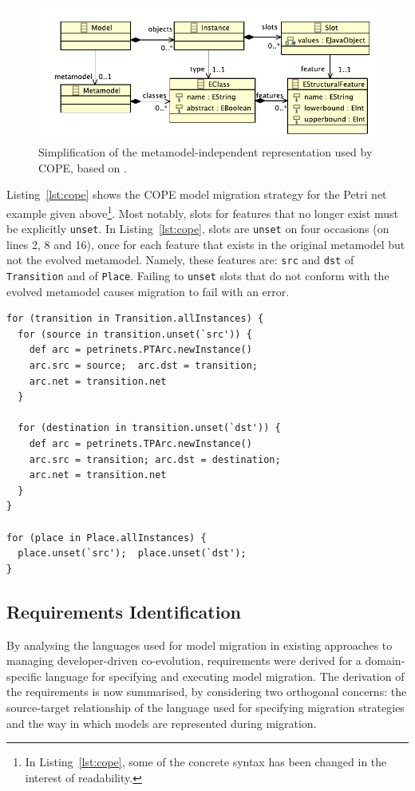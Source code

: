 \begin{figure}[tbp]
  \centering
  \includegraphics[scale=0.75]{5.Implementation/cope_mm.pdf}
  \caption[The metamodel-independent representation used by COPE]{Simplification of the metamodel-independent representation used by COPE, based on \cite{herrmannsdoerfer09cope}.}
  \label{fig:cope_mmi}
\end{figure}

Listing~\ref{lst:cope} shows the COPE model migration strategy for the Petri net example given above\footnote{In Listing~\ref{lst:cope}, some of the concrete syntax has been changed in the interest of readability.}. Most notably, slots for features that no longer exist must be explicitly \texttt{unset}. In Listing~\ref{lst:cope}, slots are \texttt{unset} on four occasions (on lines 2, 8 and 16), once for each feature that exists in the original metamodel but not the evolved metamodel. Namely, these features are: \texttt{src} and \texttt{dst} of \texttt{Transition} and of \texttt{Place}. Failing to \texttt{unset} slots that do not conform with the evolved metamodel causes migration to fail with an error.

\begin{lstlisting}[caption=Petri nets model migration in COPE, label=lst:cope, language=COPE]
for (transition in Transition.allInstances) {
  for (source in transition.unset(`src')) {
    def arc = petrinets.PTArc.newInstance()
    arc.src = source;  arc.dst = transition;
    arc.net = transition.net
  }

  for (destination in transition.unset(`dst')) {
    def arc = petrinets.TPArc.newInstance() 
    arc.src = transition; arc.dst = destination;
    arc.net = transition.net
  }
}

for (place in Place.allInstances) {
  place.unset(`src');  place.unset(`dst');
}
\end{lstlisting}


\subsection{Requirements Identification}
\label{subsec:analysis}
By analysing the languages used for model migration in existing approaches to managing developer-driven co-evolution, requirements were derived for a domain-specific language for specifying and executing model migration. The derivation of the requirements is now summarised, by considering two orthogonal concerns: the source-target relationship of the language used for specifying migration strategies and the way in which models are represented during migration. %


